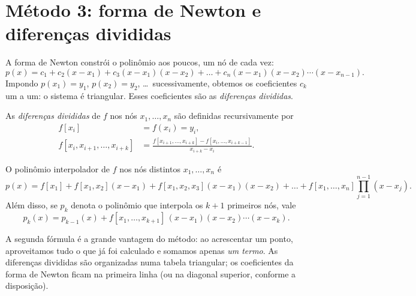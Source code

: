 \section{Método 3: forma de Newton e diferenças divididas}

A forma de Newton constrói o polinômio aos poucos, um nó de cada vez:
\[
p(x)=c_1+c_2(x-x_1)+c_3(x-x_1)(x-x_2)+\dots+c_n(x-x_1)(x-x_2)\cdots(x-x_{n-1}).
\]
Impondo $p(x_1)=y_1$, $p(x_2)=y_2$, \dots\ sucessivamente, obtemos os coeficientes $c_k$ um a
um: o sistema é triangular. Esses coeficientes são as \emph{diferenças divididas}.

\begin{definicao}
As \emph{diferenças divididas} de $f$ nos nós $x_1,\dots,x_n$ são definidas recursivamente por
\begin{align*}
f[x_i]&=f(x_i)=y_i,\\
f[x_i,x_{i+1},\dots,x_{i+k}]&=\frac{f[x_{i+1},\dots,x_{i+k}]-f[x_i,\dots,x_{i+k-1}]}{x_{i+k}-x_i}.
\end{align*}
\end{definicao}

\begin{teorema}
O polinômio interpolador de $f$ nos nós distintos $x_1,\dots,x_n$ é
\[
p(x)=f[x_1]+f[x_1,x_2](x-x_1)+f[x_1,x_2,x_3](x-x_1)(x-x_2)+\dots
+f[x_1,\dots,x_n]\prod_{j=1}^{n-1}(x-x_j).
\]
Além disso, se $p_{k}$ denota o polinômio que interpola os $k+1$ primeiros nós, vale
\[
p_k(x)=p_{k-1}(x)+f[x_1,\dots,x_{k+1}]\,(x-x_1)(x-x_2)\cdots(x-x_k).
\]
\end{teorema}

A segunda fórmula é a grande vantagem do método: ao acrescentar um ponto, aproveitamos
tudo o que já foi calculado e somamos apenas \emph{um termo}. As diferenças divididas são
organizadas numa tabela triangular; os coeficientes da forma de Newton ficam na primeira
linha (ou na diagonal superior, conforme a disposição).

